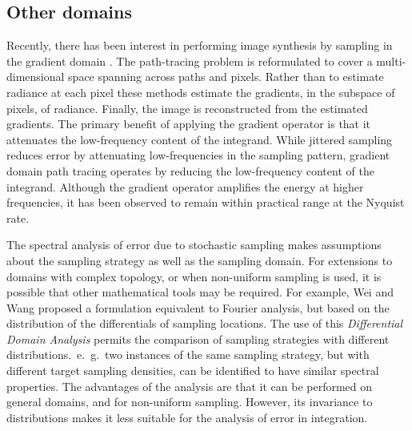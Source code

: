 %
%
%
\subsection{Other domains}

Recently, there has been interest in performing image synthesis by sampling in the gradient domain \cite{Kettunen2015sg}. The path-tracing problem is reformulated to cover a multi-dimensional space spanning across paths and pixels. Rather than to estimate radiance at each pixel these methods estimate the gradients, in the subspace of pixels, of radiance. Finally, the image is reconstructed from the estimated gradients. The primary benefit of applying the gradient operator is that it attenuates the low-frequency content of the integrand. While jittered sampling reduces error by attenuating low-frequencies in the sampling pattern, gradient domain path tracing operates by reducing the low-frequency content of the integrand.  Although the gradient operator amplifies the energy at higher frequencies, it has been observed to remain within practical range at the Nyquist rate.

The spectral analysis of error due to stochastic sampling makes assumptions about the sampling strategy as well as the sampling domain. For extensions to domains with complex topology, or when non-uniform sampling is used, it is possible that other mathematical tools may be required. For example, Wei and Wang \cite{export:147066} proposed a formulation equivalent to Fourier analysis, but based on the distribution of the differentials of sampling locations. The use of this \textit{Differential Domain Analysis} permits the comparison of sampling strategies with different distributions.~e.~g.~two instances of the same sampling strategy, but with different target sampling densities, can be identified to have similar spectral properties. The advantages of the analysis are that it can be performed on general domains, and for non-uniform sampling. However, its invariance to distributions makes it less suitable for the analysis of error in integration. 

  
%
%

%
%
%

